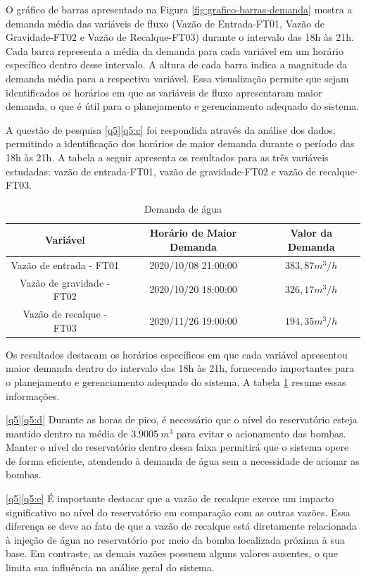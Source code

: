 O gráfico de barras apresentado na Figura \ref{fig:grafico-barras-demanda} mostra a demanda média das variáveis de fluxo (Vazão de Entrada-FT01, Vazão de Gravidade-FT02 e Vazão de Recalque-FT03) durante o intervalo das 18h às 21h. Cada barra representa a média da demanda para cada variável em um horário específico dentro desse intervalo. A altura de cada barra indica a magnitude da demanda média para a respectiva variável. Essa visualização permite que sejam identificados os horários em que as variáveis de fluxo apresentaram maior demanda, o que é útil para o planejamento e gerenciamento adequado do sistema.

A questão de pesquisa \ref{q5}\ref{q5:c} foi respondida através da análise dos dados, permitindo a identificação dos horários de maior demanda durante o período das 18h às 21h. A tabela a seguir apresenta os resultados para as três variáveis estudadas: vazão de entrada-FT01, vazão de gravidade-FT02 e vazão de recalque-FT03.




\begin{table}[H]
	\centering
	\caption{Demanda de água}\label{tb:dem}
	\begin{tabular}{@{}ccc@{}}
		\toprule
		\textbf{Variável}         & \textbf{Horário de Maior Demanda} & \textbf{Valor da Demanda} \\ \midrule
		Vazão de entrada - FT01   & 2020/10/08 21:00:00               & $383,87 m^3/h$                   \\
		Vazão de gravidade - FT02 & 2020/10/20 18:00:00               & $326,17 m^3/h$                    \\
		Vazão de recalque - FT03  & 2020/11/26 19:00:00               & $194,35 m^3/h$                    \\ \bottomrule
	\end{tabular}
	
	
\end{table}

Os resultados destacam os horários específicos em que cada variável apresentou maior demanda dentro do intervalo das 18h às 21h, fornecendo importantes para o planejamento e gerenciamento adequado do sistema. A tabela \ref{tb:dem} resume essas informações.


\eqref{q5}\ref{q5:d} Durante as horas de pico, é necessário que o nível do reservatório esteja mantido dentro na média de $3.9005 \ m^3$ para evitar o acionamento das bombas. Manter o nível do reservatório dentro dessa faixa permitirá que o sistema opere de forma eficiente, atendendo à demanda de água sem a necessidade de acionar as bombas.

\eqref{q5}\ref{q5:e} É importante destacar que a vazão de recalque exerce um impacto significativo no nível do reservatório em comparação com as outras vazões. Essa diferença se deve ao fato de que a vazão de recalque está diretamente relacionada à injeção de água no reservatório por meio da bomba localizada próxima à sua base. Em contraste, as demais vazões possuem alguns valores ausentes, o que limita sua influência na análise geral do sistema.







